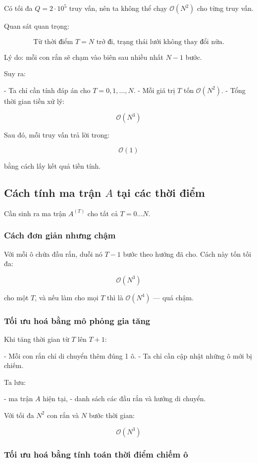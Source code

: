 Có tối đa $Q = 2 \cdot 10^5$ truy vấn, nên ta không thể chạy $\mathcal{O}(N^2)$ cho từng truy vấn.

Quan sát quan trọng:

\[
\text{Từ thời điểm } T = N \text{ trở đi, trạng thái lưới không thay đổi nữa.}
\]

Lý do: mỗi con rắn sẽ chạm vào biên sau nhiều nhất $N-1$ bước.

Suy ra:

- Ta chỉ cần tính đáp án cho $T = 0, 1, \ldots, N$.
- Mỗi giá trị $T$ tốn $\mathcal{O}(N^2)$.
- Tổng thời gian tiền xử lý:

\[
\mathcal{O}(N^3)
\]

Sau đó, mỗi truy vấn trả lời trong:

\[
\mathcal{O}(1)
\]

bằng cách lấy kết quả tiền tính.

\subsection*{Cách tính ma trận $A$ tại các thời điểm}

Cần sinh ra ma trận $A^{(T)}$ cho tất cả $T = 0 \ldots N$.

\subsubsection*{Cách đơn giản nhưng chậm}

Với mỗi ô chứa đầu rắn, duỗi nó $T-1$ bước theo hướng đã cho.  
Cách này tốn tối đa:

\[
\mathcal{O}(N^3)
\]

cho một $T$, và nếu làm cho mọi $T$ thì là $\mathcal{O}(N^4)$ — quá chậm.

\subsubsection*{Tối ưu hoá bằng mô phỏng gia tăng}

Khi tăng thời gian từ $T$ lên $T+1$:

- Mỗi con rắn chỉ di chuyển thêm đúng 1 ô.
- Ta chỉ cần cập nhật những ô mới bị chiếm.

Ta lưu:

- ma trận $A$ hiện tại,
- danh sách các đầu rắn và hướng di chuyển.

Với tối đa $N^2$ con rắn và $N$ bước thời gian:

\[
\mathcal{O}(N^3)
\]

\subsubsection*{Tối ưu hoá bằng tính toán thời điểm chiếm ô}

